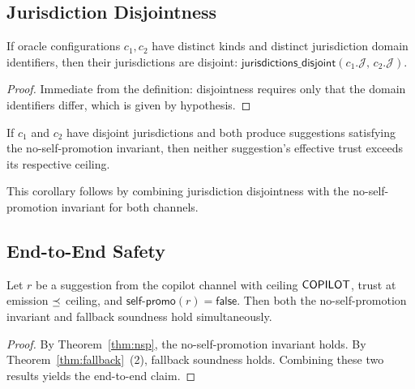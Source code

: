 \documentclass[11pt]{article}
\newcommand{\selfpromo}{\mathsf{self\text{-}promo}}
\begin{document}
\subsection{Jurisdiction Disjointness}\label{sec:thm-jurisdiction}

\begin{theorem}\label{thm:jurisdiction}
If oracle configurations $c_1, c_2$ have distinct kinds and
distinct jurisdiction domain identifiers, then their jurisdictions
are disjoint:
$\mathsf{jurisdictions\_disjoint}(c_1.\mathcal{J},\, c_2.\mathcal{J})$.
\end{theorem}

\begin{proof}
Immediate from the definition: disjointness requires only that the
domain identifiers differ, which is given by hypothesis.
\end{proof}

\begin{corollary}\label{cor:disjoint-safe}
If $c_1$ and $c_2$ have disjoint jurisdictions and both produce
suggestions satisfying the no-self-promotion invariant, then neither
suggestion's effective trust exceeds its respective ceiling.
\end{corollary}

This corollary follows by combining jurisdiction disjointness with the
no-self-promotion invariant for both channels.

\subsection{End-to-End Safety}\label{sec:thm-e2e}

\begin{theorem}\label{thm:e2e}
Let $r$ be a suggestion from the copilot channel with ceiling
$\mathsf{COPILOT}$, trust at emission $\preceq$ ceiling, and
$\selfpromo(r) = \mathsf{false}$.  Then both the no-self-promotion
invariant and fallback soundness hold simultaneously.
\end{theorem}

\begin{proof}
By Theorem~\ref{thm:nsp}, the no-self-promotion invariant holds.
By Theorem~\ref{thm:fallback}~(2), fallback soundness holds.
Combining these two results yields the end-to-end claim.
\end{proof}

\end{document}
